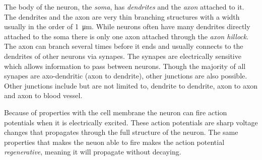 \documentclass[altfont, fleqn]{uiophd}
\begin{document}
The body of the neuron, the \emph{soma}, has \emph{dendrites} and 
the \emph{axon} attached to it. 
The dendrites and the axon are very thin branching structures 
with a width usually in the order of \SI{1}{\micro\metre}. 
While neurons often have many dendrites directly attached to the soma
there is only one axon attached through the \emph{axon hillock}.
The axon can branch several times before it ends and 
usually connects to the dendrites of other neurons via synapes.
The synapes are electrically sensitive which allows information
to pass between neurons. 
Though the majority of all synapes are axo-dendritic 
(axon to dendrite),
other junctions are also possible.
Other junctions include but are not limited to,
dendrite to dendrite, 
axon to axon and 
axon to blood vessel. 

Because of properties with the cell membrane the neuron can
fire action potentials when it is electrically excited. 
These action potentials are sharp voltage changes that propagates through
the full structure of the neuron. 
The same properties that makes the neuon able to fire makes 
the action potential \emph{regenerative}, meaning it will propagate
without decaying.





\end{document}
